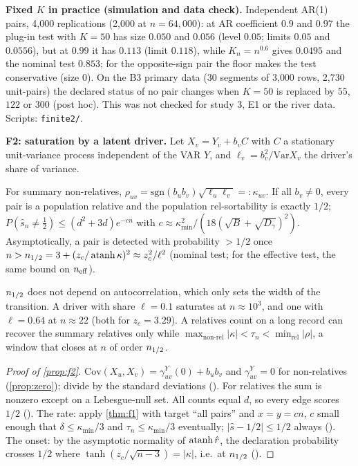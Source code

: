 \textbf{Fixed $K$ in practice (simulation and data check).} Independent AR(1)
pairs, 4{,}000 replications (2{,}000 at $n=64{,}000$): at AR coefficient
$0.9$ and $0.97$ the plug-in test with $K=50$ has size $0.050$ and $0.056$
(level $0.05$; limits $0.05$ and $0.0556$), but at $0.99$ it has $0.113$
(limit $0.118$), while $K_n=n^{0.6}$ gives $0.0495$ and the nominal test
$0.853$; for the opposite-sign pair the floor makes the test conservative
(size $0$). On the B3 primary data (30 segments of 3{,}000 rows, 2{,}730
unit-pairs) the declared status of no pair changes when $K=50$ is replaced
by $55$, $122$ or $300$ (post hoc). This was not checked for study 3, E1 or
the river data. Scripts: \texttt{finite2/}.


\textbf{F2: saturation by a latent driver.} Let $X_v=Y_v+b_vC$ with $C$ a
stationary unit-variance process independent of the VAR $Y$, and
$\ell_v=b_v^2/\mathrm{Var}X_v$ the driver's share of variance.

\begin{proposition}[saturation]\label{prop:f2}
For summary non-relatives,
$\rho_{uv}=\mathrm{sgn}(b_ub_v)\sqrt{\ell_u\ell_v}=:\kappa_{uv}$. If all $b_v\ne0$,
every pair is a population relative and the population rel-sortability is
exactly $1/2$; $P(\hat s_n\ne\frac12)\le(d^2{+}3d)e^{-cn}$ with
$c\approx\kappa_{\min}^2/(18(\sqrt B+\sqrt{D_\gamma})^2)$. Asymptotically, a pair is
detected with probability $>1/2$ once
$n>n_{1/2}=3+(z_c/\operatorname{atanh}\kappa)^2\approx z_c^2/\ell^2$ (nominal test; for the
effective test, the same bound on $n_{\mathrm{eff}}$).
\end{proposition}
$n_{1/2}$ does not depend on autocorrelation, which only sets the width of the
transition. A driver with share $\ell=0.1$ saturates at $n\approx10^3$, and
one with $\ell=0.64$ at $n\approx22$ (both for $z_c=3.29$). A relatives count on a long record can
recover the summary relatives only while
$\max_{\text{non-rel}}|\kappa|<\tau_n<\min_{\text{rel}}|\rho|$, a window that
closes at $n$ of order $n_{1/2}$.

\begin{proof}[Proof of \cref{prop:f2}]
$\mathrm{Cov}(X_u,X_v)=\gamma^Y_{uv}(0)+b_ub_v$ and $\gamma^Y_{uv}=0$ for
non-relatives (\cref{prop:zero}); divide by the standard deviations
(). For relatives the sum is nonzero except on a
Lebesgue-null set. All counts equal $d$, so every edge scores $1/2$
(). The rate: apply \cref{thm:f1} with target ``all
pairs'' and $x=y=cn$, $c$ small enough that $\delta\le\kappa_{\min}/3$ and
$\tau_n\le\kappa_{\min}/3$ eventually; $|\hat s-1/2|\le1/2$ always
(). The onset: by the asymptotic normality of
$\operatorname{atanh}\hat r$, the declaration probability crosses $1/2$ where
$\tanh(z_c/\sqrt{n-3})=|\kappa|$, i.e.\ at $n_{1/2}$ ().
\end{proof}

